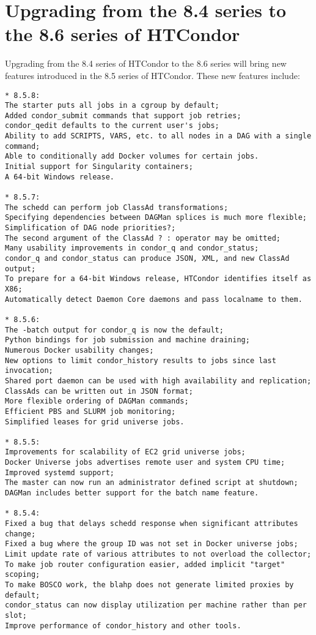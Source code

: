 \section{\label{sec:to-8.6}Upgrading from the 8.4 series to the 8.6 series of HTCondor}

Upgrading from the 8.4 series of HTCondor to the 8.6 series
will bring new features introduced in the 8.5 series of HTCondor.
These new features include:

\begin{verbatim}
* 8.5.8:
The starter puts all jobs in a cgroup by default;
Added condor_submit commands that support job retries;
condor_qedit defaults to the current user's jobs;
Ability to add SCRIPTS, VARS, etc. to all nodes in a DAG with a single command;
Able to conditionally add Docker volumes for certain jobs.
Initial support for Singularity containers;
A 64-bit Windows release.

* 8.5.7:
The schedd can perform job ClassAd transformations;
Specifying dependencies between DAGMan splices is much more flexible;
Simplification of DAG node priorities?;
The second argument of the ClassAd ? : operator may be omitted;
Many usability improvements in condor_q and condor_status;
condor_q and condor_status can produce JSON, XML, and new ClassAd output;
To prepare for a 64-bit Windows release, HTCondor identifies itself as X86;
Automatically detect Daemon Core daemons and pass localname to them.

* 8.5.6:
The -batch output for condor_q is now the default;
Python bindings for job submission and machine draining;
Numerous Docker usability changes;
New options to limit condor_history results to jobs since last invocation;
Shared port daemon can be used with high availability and replication;
ClassAds can be written out in JSON format;
More flexible ordering of DAGMan commands;
Efficient PBS and SLURM job monitoring;
Simplified leases for grid universe jobs.

* 8.5.5:
Improvements for scalability of EC2 grid universe jobs;
Docker Universe jobs advertises remote user and system CPU time;
Improved systemd support;
The master can now run an administrator defined script at shutdown;
DAGMan includes better support for the batch name feature.

* 8.5.4:
Fixed a bug that delays schedd response when significant attributes change;
Fixed a bug where the group ID was not set in Docker universe jobs;
Limit update rate of various attributes to not overload the collector;
To make job router configuration easier, added implicit "target" scoping;
To make BOSCO work, the blahp does not generate limited proxies by default;
condor_status can now display utilization per machine rather than per slot;
Improve performance of condor_history and other tools.


\end{verbatim}
